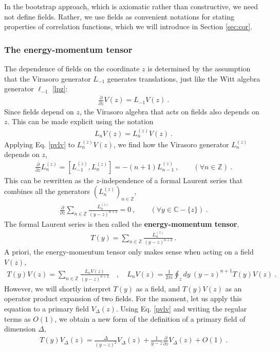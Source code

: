 \documentclass[12pt, a4paper]{article}
\theoremstyle{break}
\begin{document}
In the bootstrap approach, which is axiomatic rather than constructive, we need not define fields. Rather, we use fields as convenient notations for stating properties of correlation functions, which we will introduce in Section \ref{sec:cor}. 

\subsubsection{The energy-momentum tensor}

The dependence of fields on the coordinate $z$ is determined by the assumption that the Virasoro generator $L_{-1}$ generates translations, just like the Witt algebra generator $\ell_{-1}$ \eqref{lpz}:
\begin{align}
  \boxed{\frac{\partial}{\partial z} V(z) = L_{-1} V(z)}  \ .
  \label{pvlv}
 \end{align}
 Since fields depend on $z$, the Virasoro algebra that acts on fields also depends on $z$. This can be made explicit using the notation
\begin{align}
   L_n V(z) = L_n^{(z)} V(z) \ . 
\end{align}
Applying Eq. \eqref{pvlv} to $L_n^{(z)} V(z)$, we find how the Virasoro generator $L_n^{(z)}$ depends on $z$,
 \begin{align}
 \frac{\partial}{\partial z} L_n^{(z)} = [L_{-1}^{(z)},L_n^{(z)}]= -(n+1)L_{n-1}^{(z)}\ ,\qquad (\forall n\in\mathbb{Z})\ .
\end{align}
This can be rewritten as the $z$-independence of a formal Laurent series that combines all the generators $(L_n^{(z)})_{n\in\mathbb{Z}}$, 
\begin{align}
 \frac{\partial}{\partial z} \sum_{n\in\mathbb{Z}} \frac{L_n^{(z)}}{(y-z)^{n+2}} = 0\ ,\qquad (\forall y\in\mathbb{C}-\{z\})\ .
\end{align}
The formal Laurent series is then called the \textbf{energy-momentum tensor}, 
\begin{align}
  \boxed{T(y) = \sum_{n\in\mathbb{Z}} \frac{L_n^{(z)}}{(y-z)^{n+2}}} \ .
  \label{tl}
 \end{align}
 A priori, the energy-momentum tensor only makes sense when acting on a field $V(z)$,
 \begin{align}
 T(y)V(z) = \sum_{n\in\mathbb{Z}} \frac{L_n V(z)}{(y-z)^{n+2}}\quad , \quad L_n V(z) = \frac{1}{2\pi i} \oint_{z}dy\ (y-z)^{n+1} T(y)V(z)\ .
 \label{lvtv}
\end{align}
However, we will shortly interpret $T(y)$ as a field, and $T(y)V(z)$ as an operator product expansion of two fields. For the moment, let us apply this equation to a primary field $V_\Delta(z)$. Using Eq. \eqref{pvlv} and writing the regular terms as $O(1)$, we obtain a new form of the definition of a primary field of dimension $\Delta$,
\begin{align}
 \boxed{T(y)V_\Delta(z) = \frac{\Delta}{(y-z)^2} V_\Delta(z) + \frac{1}{y-z} \frac{\partial}{\partial z} V_\Delta(z) + O(1)}\ . 
 \label{tvd}
\end{align}
\end{document}
